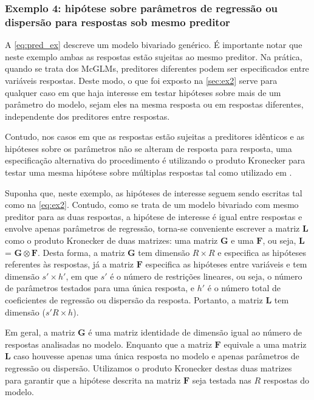 \documentclass[AMA,STIX1COL]{WileyNJD-v2}
\begin{document}
\subsubsection{Exemplo 4: hipótese sobre parâmetros de regressão ou dispersão para respostas sob mesmo preditor}\label{sec:sec_ex4}

A \autoref{eq:pred_ex} descreve um modelo bivariado genérico. É importante notar que neste exemplo ambas as respostas estão sujeitas ao mesmo preditor. Na prática, quando se trata dos McGLMs, preditores diferentes podem ser especificados entre variáveis respostas. Deste modo, o que foi exposto na \autoref{sec:ex2} serve para qualquer caso em que haja interesse em testar hipóteses sobre mais de um parâmetro do modelo, sejam eles na mesma resposta ou em respostas diferentes, independente dos preditores entre respostas.

Contudo, nos casos em que as respostas estão sujeitas a preditores idênticos e as hipóteses sobre os parâmetros não se alteram de resposta para resposta, uma especificação alternativa do procedimento é utilizando o produto Kronecker para testar uma mesma hipótese sobre múltiplas respostas tal como utilizado em \citet{plastica}.

Suponha que, neste exemplo, as hipóteses de interesse seguem sendo escritas tal como na \autoref{eq:ex2}. Contudo, como se trata de um modelo bivariado com mesmo preditor para as duas respostas, a hipótese de interesse é igual entre respostas e envolve apenas parâmetros de regressão, torna-se conveniente escrever a matriz $\boldsymbol{L}$ como o produto Kronecker de duas matrizes: uma matriz $\boldsymbol{G}$ e uma $\boldsymbol{F}$, ou seja, $\boldsymbol{L}$ = $\boldsymbol{G} \otimes \boldsymbol{F}$. Desta forma, a matriz $\boldsymbol{G}$ tem dimensão $R \times R$ e especifica as hipóteses referentes às respostas, já a matriz $\boldsymbol{F}$ especifica as hipóteses entre variáveis e tem dimensão ${s}' \times {h}'$, em que ${s}'$ é o número de restrições lineares, ou seja, o número de parâmetros testados para uma única resposta, e ${h}'$ é o número total de coeficientes de regressão ou dispersão da resposta. Portanto, a matriz $\boldsymbol{L}$ tem dimensão (${s}'R \times h$).

Em geral, a matriz $\boldsymbol{G}$ é uma matriz identidade de dimensão igual ao número de respostas analisadas no modelo. Enquanto que a matriz $\boldsymbol{F}$ equivale a uma matriz $\boldsymbol{L}$ caso houvesse apenas uma única resposta no modelo e apenas parâmetros de regressão ou dispersão. Utilizamos o produto Kronecker destas duas matrizes para garantir que a hipótese descrita na matriz $\boldsymbol{F}$ seja testada nas $R$ respostas do modelo.
\end{document}
